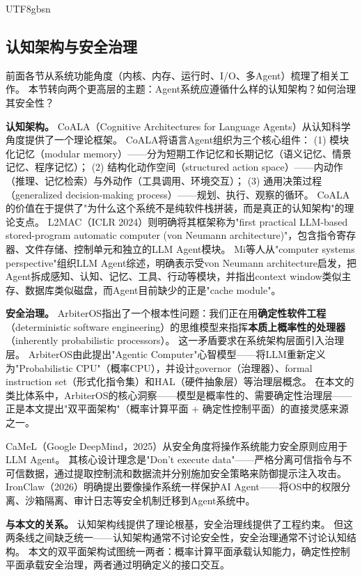 \documentclass[11pt,a4paper]{article}
\begin{document}
\begin{CJK*}{UTF8}{gbsn}
\subsection{认知架构与安全治理}
\label{sec:related-cognition-security}

前面各节从系统功能角度（内核、内存、运行时、I/O、多Agent）梳理了相关工作。
本节转向两个更高层的主题：Agent系统应遵循什么样的认知架构？如何治理其安全性？

\textbf{认知架构。}
CoALA（Cognitive Architectures for Language Agents）\cite{sumers2024coala}从认知科学角度提供了一个理论框架。
CoALA将语言Agent组织为三个核心组件：
(1) 模块化记忆（modular memory）——分为短期工作记忆和长期记忆（语义记忆、情景记忆、程序记忆）；
(2) 结构化动作空间（structured action space）——内动作（推理、记忆检索）与外动作（工具调用、环境交互）；
(3) 通用决策过程（generalized decision-making process）——规划、执行、观察的循环。
CoALA的价值在于提供了"为什么这个系统不是纯软件栈拼装，而是真正的认知架构"的理论支点。
L2MAC\cite{holt2024l2mac}（ICLR 2024）则明确将其框架称为"first practical LLM-based stored-program automatic computer (von Neumann architecture)"，包含指令寄存器、文件存储、控制单元和独立的LLM Agent模块。
Mi等人\cite{mi2025llmagentscomputersystems}从"computer systems perspective"组织LLM Agent综述，明确表示受von Neumann architecture启发，把Agent拆成感知、认知、记忆、工具、行动等模块，并指出context window类似主存、数据库类似磁盘，而Agent目前缺少的正是"cache module"。

\textbf{安全治理。}
ArbiterOS\cite{arbiteros2025}指出了一个根本性问题：我们正在用\textbf{确定性软件工程}（deterministic software engineering）的思维模型来指挥\textbf{本质上概率性的处理器}（inherently probabilistic processors）。
这一矛盾要求在系统架构层面引入治理层。
ArbiterOS由此提出"Agentic Computer"心智模型——将LLM重新定义为"Probabilistic CPU"（概率CPU），并设计governor（治理器）、formal instruction set（形式化指令集）和HAL（硬件抽象层）等治理层概念。
在本文的类比体系中，ArbiterOS的核心洞察——模型是概率性的、需要确定性治理层——正是本文提出"双平面架构"（概率计算平面 + 确定性控制平面）的直接灵感来源之一。

CaMeL\cite{debenedetti2025camel}（Google DeepMind，2025）从安全角度将操作系统能力安全原则应用于LLM Agent。
其核心设计理念是"Don't execute data"——严格分离可信指令与不可信数据，通过提取控制流和数据流并分别施加安全策略来防御提示注入攻击。
IronClaw\cite{ironclaw2025}（2026）明确提出要像操作系统一样保护AI Agent——将OS中的权限分离、沙箱隔离、审计日志等安全机制迁移到Agent系统中。

\textbf{与本文的关系。}
认知架构线提供了理论根基，安全治理线提供了工程约束。
但这两条线之间缺乏统一——认知架构通常不讨论安全性，安全治理通常不讨论认知结构。
本文的双平面架构试图统一两者：概率计算平面承载认知能力，确定性控制平面承载安全治理，两者通过明确定义的接口交互。


\end{CJK*}
\end{document}
